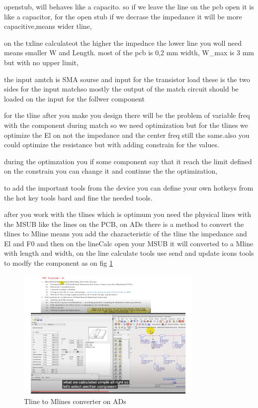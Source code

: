 \documentclass{article}
\begin{document}
\begin{itemize}
openstub,  will behaves like a capacito. so if we leave the line on the pcb open it is like a capacitor, for the open stub if we decrase the  impedance it will be more capacitive,means wider tline, 

on the txline calculateot the  higher the impednce the lower line you woll need means smaller W and Length. most of the pcb is 0,2 mm width, W_max is 3 mm but with no upper limit,


the input amtch is SMA  sourse and  input for the transistor load  these is the two sides for the input matchso mostly the output of the match circuit should be loaded on the input for the follwer component 

for the tline after you make you design there will be the problem of variable freq with the component during match so we need optimization but for the tlines we optimize the El on not the impedance and the center freq still the same.also you could optimize the resistance but with adding constrain for the values.

during the optimzation you if some component say that it reach the limit defined on the  constrain you can change it and continue the the optimization,

to add the important tools from the device you can define your own hotkeys from the hot key tools bard and fine the needed tools. 

after you work with the tlines which is optimum you need the physical lines with the MSUB  like the lines on the PCB, on ADs there is a method to convert the tlines  to Mline means you add the characteristic of the tline the impedance and El and F0 and then on the lineCalc open your MSUB it will converted to a Mline with length and width, on the line calculate tools use send and update icons tools to modfy the component as on fig \cref{Anurug rf8_0}

\begin{figure}[H]
    \centering
    \includegraphics[width=0.8\textwidth]{figures/Anurug rf8_0.pdf}
    \caption{Tline to Mlines converter on ADs }
    \label{Anurug rf8_0}
\end{figure}


\end{itemize}
\end{document}
